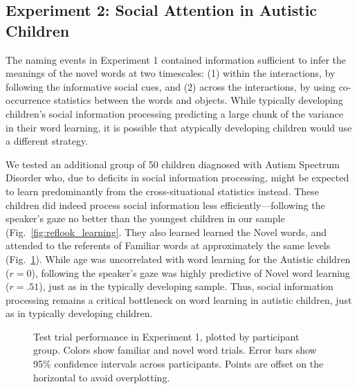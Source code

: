 \documentclass{pnastwo}
\begin{document}
\begin{article}
\section{Experiment 2: Social Attention in Autistic Children}

The naming events in Experiment 1 contained information sufficient to infer the meanings of the novel words at two timescales: (1) within the interactions, by following the informative social cues, and (2) across the interactions, by using co-occurrence statistics between the words and objects. While typically developing children's social information processing predicting a large chunk of the variance in their word learning, it is possible that atypically developing children would use a different strategy.

We tested an additional group of 50 children diagnosed with Autism Spectrum Disorder who, due to deficits in social information processing, might be expected to learn predominantly from the cross-situational statistics instead. These children did indeed process social information less efficiently---following the speaker's gaze no better than the youngest children in our sample (Fig.~\ref{fig:reflook_learning}. They also learned learned the Novel words, and attended to the referents of Familiar words at approximately the same levels (Fig.~\ref{fig:reflook_test}). While age was uncorrelated with word learning for the Autistic children ($r = 0$), following the speaker's gaze was highly predictive of Novel word learning ($r = .51$), just as in the typically developing sample. Thus, social information processing remains a critical bottleneck on word learning in autistic children, just as in typically developing children.


\begin{figure}[b]
	\caption{\label{fig:reflook_test} Test trial performance in Experiment 1, plotted by participant group. Colors show familiar and novel word trials. Error bars show 95\% confidence intervals across participants. Points are offset on the horizontal to avoid overplotting.}
\end{figure}


\end{article}
\end{document}
